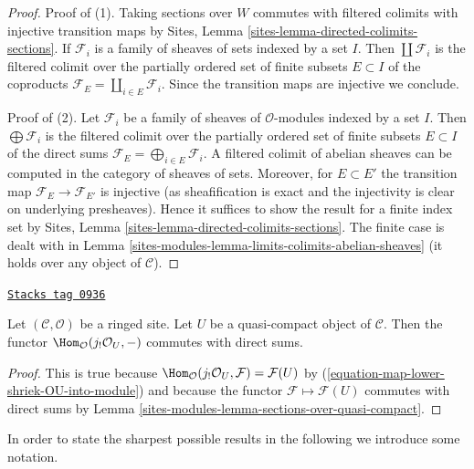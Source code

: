 \begin{proof}
Proof of (1). Taking sections over $W$ commutes with filtered colimits
with injective transition maps by
Sites, Lemma \ref{sites-lemma-directed-colimits-sections}.
If $\mathcal{F}_i$ is a family of sheaves of sets
indexed by a set $I$. Then $\coprod \mathcal{F}_i$ is the filtered
colimit over the partially ordered set of finite subsets
$E \subset I$ of the coproducts
$\mathcal{F}_E = \coprod_{i \in E} \mathcal{F}_i$.
Since the transition maps are injective we conclude.

\medskip\noindent
Proof of (2).
Let $\mathcal{F}_i$ be a family of sheaves of $\mathcal{O}$-modules
indexed by a set $I$. Then $\bigoplus \mathcal{F}_i$ is the filtered
colimit over the partially ordered set of finite subsets
$E \subset I$ of the direct sums
$\mathcal{F}_E = \bigoplus_{i \in E} \mathcal{F}_i$.
A filtered colimit of abelian sheaves can be computed in the
category of sheaves of sets. Moreover, for $E \subset E'$ the transition map
$\mathcal{F}_E \to \mathcal{F}_{E'}$ is injective (as sheafification
is exact and the injectivity is clear on underlying presheaves).
Hence it suffices to show the result for a finite index set by
Sites, Lemma \ref{sites-lemma-directed-colimits-sections}.
The finite case is dealt with in
Lemma \ref{sites-modules-lemma-limits-colimits-abelian-sheaves}
(it holds over any object of $\mathcal{C}$).
\end{proof}

\begin{lemma}
\label{sites-modules-lemma-quasi-compact-hom-from}
\href{https://stacks.math.columbia.edu/tag/0936}{\texttt{Stacks tag 0936}}

Let $(\mathcal{C}, \mathcal{O})$ be a ringed site. Let $U$ be a quasi-compact
object of $\mathcal{C}$. Then the functor
$\Hom_\mathcal{O}(j_!\mathcal{O}_U, -)$ commutes with direct sums.
\end{lemma}

\begin{proof}
This is true because
$\Hom_\mathcal{O}(j_!\mathcal{O}_U, \mathcal{F}) = \mathcal{F}(U)$
by (\ref{equation-map-lower-shriek-OU-into-module})
and because the functor $\mathcal{F} \mapsto \mathcal{F}(U)$
commutes with direct sums by
Lemma \ref{sites-modules-lemma-sections-over-quasi-compact}.
\end{proof}

In order to state the sharpest possible results in the following
we introduce some notation.

